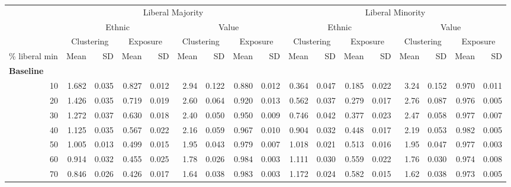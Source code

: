 \documentclass[
]{article}
\begin{document}
\begin{table}[H]
\begin{table}
{\begin{tabular}{r|r|r|r|r|r|r|r|r|r|r|r|r|r|r|r|r}
\hline
\multicolumn{1}{c|}{ } & \multicolumn{8}{c|}{Liberal Majority} & \multicolumn{8}{c}{Liberal Minority} \\
\cline{2-9} \cline{10-17}
\multicolumn{1}{c|}{ } & \multicolumn{4}{c|}{Ethnic} & \multicolumn{4}{c|}{Value} & \multicolumn{4}{c|}{Ethnic} & \multicolumn{4}{c}{Value} \\
\cline{2-5} \cline{6-9} \cline{10-13} \cline{14-17}
\multicolumn{1}{c|}{ } & \multicolumn{2}{c|}{Clustering} & \multicolumn{2}{c|}{Exposure} & \multicolumn{2}{c|}{Clustering} & \multicolumn{2}{c|}{Exposure} & \multicolumn{2}{c|}{Clustering} & \multicolumn{2}{c|}{Exposure} & \multicolumn{2}{c|}{Clustering} & \multicolumn{2}{c}{Exposure} \\
\cline{2-3} \cline{4-5} \cline{6-7} \cline{8-9} \cline{10-11} \cline{12-13} \cline{14-15} \cline{16-17}
\% liberal min & Mean & SD & Mean & SD & Mean & SD & Mean & SD & Mean & SD & Mean & SD & Mean & SD & Mean & SD\\
\hline
\multicolumn{17}{l}{\textbf{Baseline}}\\
\hline
\hspace{1em}10 & 1.682 & 0.035 & 0.827 & 0.012 & 2.94 & 0.122 & 0.880 & 0.012 & 0.364 & 0.047 & 0.185 & 0.022 & 3.24 & 0.152 & 0.970 & 0.011\\
\hline
\hspace{1em}20 & 1.426 & 0.035 & 0.719 & 0.019 & 2.60 & 0.064 & 0.920 & 0.013 & 0.562 & 0.037 & 0.279 & 0.017 & 2.76 & 0.087 & 0.976 & 0.005\\
\hline
\hspace{1em}30 & 1.272 & 0.037 & 0.630 & 0.018 & 2.40 & 0.050 & 0.950 & 0.009 & 0.746 & 0.042 & 0.377 & 0.023 & 2.47 & 0.058 & 0.977 & 0.007\\
\hline
\hspace{1em}40 & 1.125 & 0.035 & 0.567 & 0.022 & 2.16 & 0.059 & 0.967 & 0.010 & 0.904 & 0.032 & 0.448 & 0.017 & 2.19 & 0.053 & 0.982 & 0.005\\
\hline
\hspace{1em}50 & 1.005 & 0.013 & 0.499 & 0.015 & 1.95 & 0.043 & 0.979 & 0.007 & 1.018 & 0.021 & 0.513 & 0.016 & 1.95 & 0.047 & 0.977 & 0.003\\
\hline
\hspace{1em}60 & 0.914 & 0.032 & 0.455 & 0.025 & 1.78 & 0.026 & 0.984 & 0.003 & 1.111 & 0.030 & 0.559 & 0.022 & 1.76 & 0.030 & 0.974 & 0.008\\
\hline
\hspace{1em}70 & 0.846 & 0.026 & 0.426 & 0.017 & 1.64 & 0.038 & 0.983 & 0.003 & 1.172 & 0.024 & 0.582 & 0.015 & 1.62 & 0.038 & 0.973 & 0.005\\

\end{tabular}}
\end{table}
\end{table}
\end{document}
